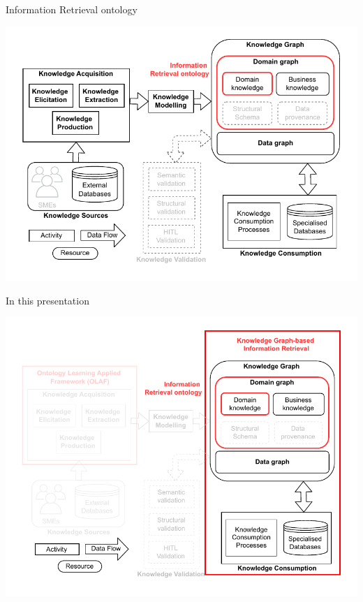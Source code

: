 \begin{frame}{Information Retrieval ontology}

        \begin{center}
            \includegraphics[scale=0.6]{images/KGBS-knowledge-modelling-kg-IR-onto-legende.pdf} 
        \end{center}

\end{frame}

\begin{frame}{In this presentation}

        \begin{center}
            \includegraphics[scale=0.6]{images/KGBS-architecture-focus-TP-expe-IR-onto-legende.pdf} 
        \end{center}

\end{frame}